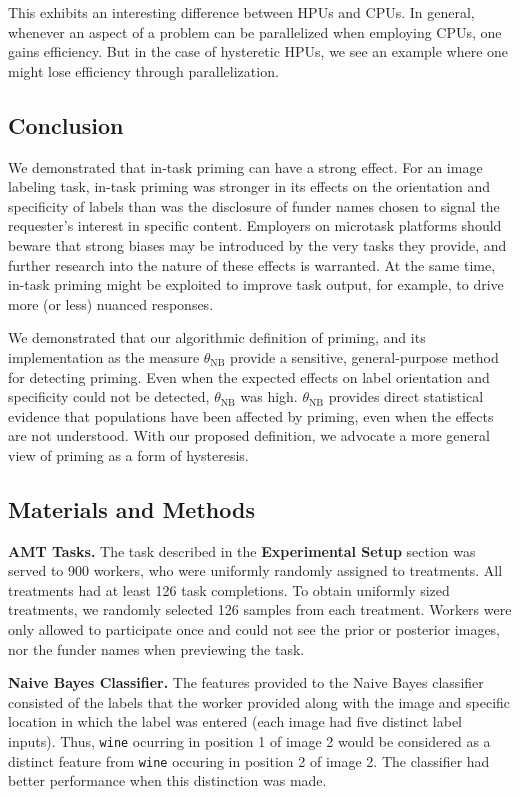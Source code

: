\documentclass[a4paper]{report}
\begin{document}
This exhibits an interesting difference between HPUs and CPUs.  In general,
whenever an aspect of a problem can be parallelized when employing CPUs, one
gains efficiency.  But in the case of hysteretic HPUs, we see an 
example where one might lose efficiency through parallelization.

\subsection*{Conclusion}
We demonstrated that in-task priming can have a strong effect.  
For an image labeling task, in-task priming was stronger in its effects on 
the orientation and specificity of labels than was the disclosure of funder 
names chosen to signal the requester's interest in specific content.
Employers on microtask platforms should 
beware that strong biases may be introduced by the very tasks they provide,
and further research into the nature of these effects is warranted.  At the 
same time, in-task priming might be exploited to improve task output, for 
example, to drive more (or less) nuanced responses.

We demonstrated that our algorithmic definition of priming, and its 
implementation as the measure $\theta_\text{NB}$ provide a sensitive,
general-purpose method for detecting priming.  Even when the expected effects 
on label orientation and specificity could not be detected, $\theta_\text{NB}$ 
was high.  $\theta_\text{NB}$ provides direct statistical evidence that 
populations have been affected by priming, even when the effects are not 
understood. With our proposed definition, we advocate a more general view of 
priming as a form of hysteresis.

\subsection*{Materials and Methods}

\textbf{AMT Tasks.} The task described in the \textbf{Experimental Setup}
section was served to 900 workers, who were uniformly randomly assigned to
treatments.  All treatments had at least 126 task completions.  To obtain 
uniformly sized treatments, we randomly selected 126 samples from each 
treatment. Workers were
only allowed to participate once and could not see the prior or posterior 
images, nor the funder names when previewing the task.

\textbf{Naive Bayes Classifier.}
The features provided to the Naive Bayes classifier consisted of the labels
that the worker provided along with the image and specific location in which 
the label was entered
(each image had five distinct label inputs).  Thus, \texttt{wine} ocurring in 
position 1 of image 2 would be considered as a distinct feature from 
\texttt{wine} occuring in position 2 of image 2. The classifier 
had better performance when this distinction was made.
\end{document}
